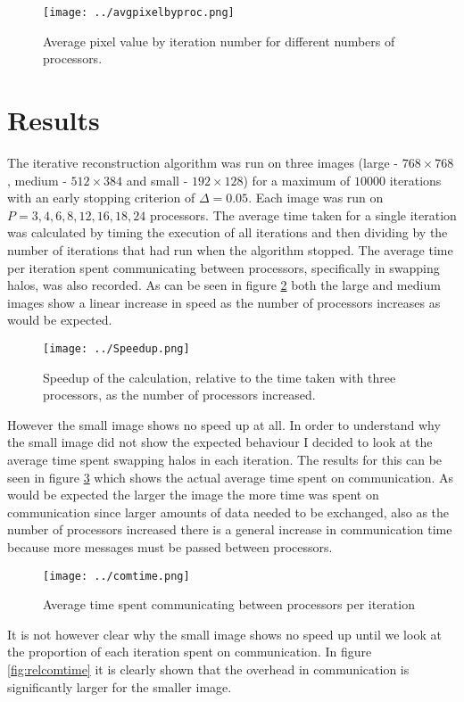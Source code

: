 \documentclass[12pt]{article}
\begin{document}
\begin{figure}[H]
        \centering
        \texttt{[image: ../avgpixelbyproc.png]}
        \caption{Average pixel value by iteration number for different numbers of processors.}\label{fig:avgpixelbyproc}
\end{figure}
 
\section{Results}

The iterative reconstruction algorithm was run on three images (large - $768\times768$, medium - $512\times384$ and small - $192\times128$) for a maximum of $10000$ iterations with an early stopping criterion of $\Delta = 0.05$. Each image was run on $P= 3,4,6,8,12,16,18,24$ processors. The average time taken for a single iteration was calculated by timing the execution of all iterations and then dividing by the number of iterations that had run when the algorithm stopped. The average time per iteration spent communicating between processors, specifically in swapping halos, was also recorded. As can be seen in figure \ref{fig:Speedup} both the large and medium images show a linear increase in speed as the number of processors increases as would be expected. 
\begin{figure}[H]
        \centering
        \texttt{[image: ../Speedup.png]}
        \caption{Speedup of the calculation, relative to the time taken with three processors, as the number of processors increased.}\label{fig:Speedup}
\end{figure}
However the small image shows no speed up at all. In order to understand why the small image did not show the expected behaviour I decided to look at the average time spent swapping halos in each iteration. The results for this can be seen in figure \ref{fig:comtime} which shows the actual average time spent on communication. As would be expected the larger the image the more time was spent on communication since larger amounts of data needed to be exchanged, also as the number of processors increased there is a general increase in communication time because more messages must be passed between processors. 
\begin{figure}[H]
        \centering
        \texttt{[image: ../comtime.png]}
        \caption{Average time spent communicating between processors per iteration}\label{fig:comtime}
\end{figure}
It is not however clear why the small image shows no speed up until we look at the proportion of each iteration spent on communication. In figure \ref{fig:relcomtime} it is clearly shown that the overhead in communication is significantly larger for the smaller image. 
\end{document}
